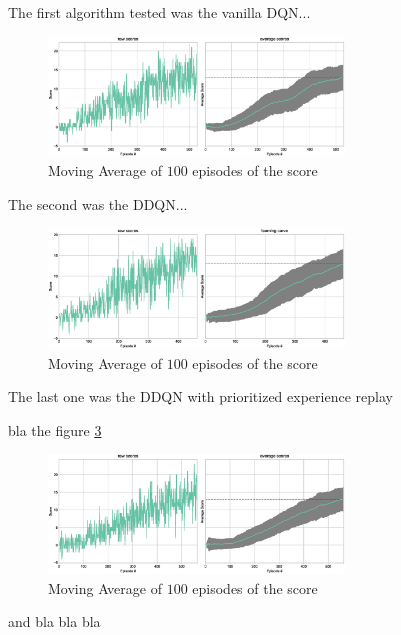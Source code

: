 \documentclass[a4paper]{article}
\begin{document}
The first algorithm tested was the vanilla DQN...

\begin{figure}[ht]
\centering
\includegraphics[width=0.7\textwidth]{../notebooks/figures/2018-08-24-dqn.eps}
\caption{Moving Average of $100$ episodes of the score}
\label{fig:dqn}
\end{figure}


The second was the DDQN...

\begin{figure}[ht]
\centering
\includegraphics[width=0.7\textwidth]{../notebooks/figures/2018-08-24-ddqn-learning-curve.eps}
\caption{Moving Average of $100$ episodes of the score}
\label{fig:ddqn}
\end{figure}

The last one was the DDQN with prioritized experience replay

bla the figure \ref{fig:ddqnper}

\begin{figure}[ht]
\centering
\includegraphics[width=0.7\textwidth]{../notebooks/figures/2018-08-23-ddqnpre-learning-curve.eps}
\caption{Moving Average of $100$ episodes of the score}
\label{fig:ddqnper}
\end{figure}


and bla bla bla
\end{document}
